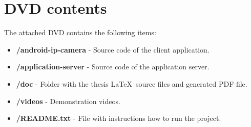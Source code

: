 \chapter{DVD contents}

\noindent
The attached DVD contains the following items:
\begin{itemize}
	\item \textbf{/android-ip-camera} - Source code of the client application.
	\item \textbf{/application-server} - Source code of the application server.
	\item \textbf{/doc} - Folder with the thesis \LaTeX ~source files and generated PDF file.
	\item \textbf{/videos} - Demonstration videos.
	\item \textbf{/README.txt} - File with instructions how to run the project.
\end{itemize}



